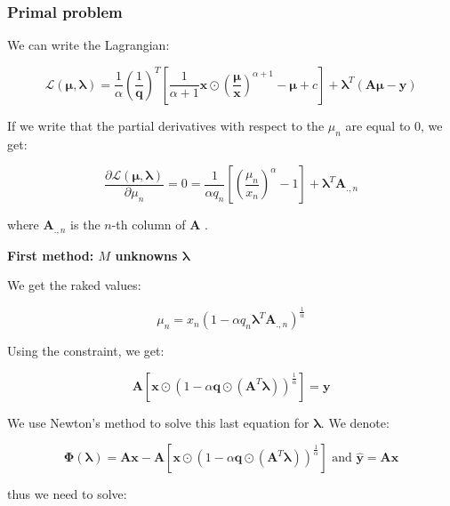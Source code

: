 \documentclass{tex/note}
\begin{document}
\subsubsection{Primal problem}

We can write the Lagrangian:

\begin{equation*}
\mathcal{L} \left( \bm{\mu} , \bm{\lambda} \right) = \frac{1}{\alpha} \left( \frac{1}{\bm{q}} \right)^T \left[ \frac{1}{\alpha + 1} \bm{x} \odot \left( \frac{\bm{\mu}}{\bm{x}} \right) ^{\alpha + 1} - \bm{\mu} + c \right] + \bm{\lambda}^T \left( \bm{A} \bm{\mu} - \bm{y} \right)
\end{equation*}

If we write that the partial derivatives with respect to the $\mu_n$ are equal to $0$, we get:

\begin{equation*}
\frac{\partial \mathcal{L} \left( \bm{\mu} , \bm{\lambda} \right)}{\partial \mu_n} = 0 =
\frac{1}{\alpha q_n} \left[ \left( \frac{\mu_n}{x_n} \right) ^{\alpha} - 1\right] + \bm{\lambda}^T \bm{A}_{.,n}
\end{equation*}

where $\bm{A}_{.,n}$ is the $n$-th column of $\bm{A}$ .

\textbf{First method: $M$ unknowns $\bm{\lambda}$}

We get the raked values:

\begin{equation*}
\mu_n = x_n \left( 1 - \alpha q_n \bm{\lambda}^T \bm{A}_{.,n} \right)^{\frac{1}{\alpha}}
\end{equation*}

Using the constraint, we get:

\begin{equation*}
\bm{A} \left[ \bm{x} \odot \left( 1 - \alpha \bm{q} \odot \left( \bm{A}^T \bm{\lambda} \right) \right)^{\frac{1}{\alpha}} \right] = \bm{y}
\end{equation*}

We use Newton’s method to solve this last equation for $\bm{\lambda}$. We denote:

\begin{equation*}
\bm{\Phi} \left( \bm{\lambda} \right) = \bm{A} \bm{x} - \bm{A} \left[ \bm{x} \odot \left( 1 - \alpha \bm{q} \odot \left( \bm{A}^T \bm{\lambda} \right) \right)^{\frac{1}{\alpha}} \right] \text{ and } \hat{\bm{y}} = \bm{A} \bm{x}
\end{equation*}

thus we need to solve:
\end{document}
